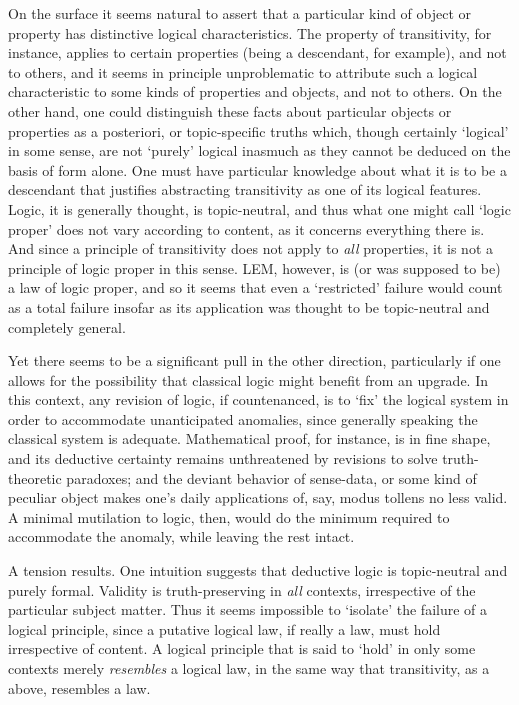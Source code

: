 On the surface it seems natural to assert that a particular kind of object or property has distinctive logical characteristics. The property of transitivity, for instance, applies to certain properties (being a descendant, for example), and not to others, and it seems in principle unproblematic to attribute such a logical characteristic to some kinds of properties and objects, and not to others. On the other hand, one could distinguish these facts about particular objects or properties as a posteriori, or topic-specific truths which, though certainly `logical' in some sense, are not `purely' logical inasmuch as they cannot be deduced on the basis of form alone. One must have particular knowledge about what it is to be a descendant that justifies abstracting transitivity as one of its logical features. Logic, it is generally thought, is topic-neutral, and thus what one might call `logic proper' does not vary according to content, as it concerns everything there is. And since a principle of transitivity does not apply to \emph{all} properties, it is not a principle of logic proper in this sense. LEM, however, is (or was supposed to be) a law of logic proper, and so it seems that even a `restricted' failure would count as a total failure insofar as its application was thought to be topic-neutral and completely general.

Yet there seems to be a significant pull in the other direction, particularly if one allows for the possibility that classical logic might benefit from an upgrade. In this context, any revision of logic, if countenanced, is to `fix' the logical system in order to accommodate unanticipated anomalies, since generally speaking the classical system is adequate. Mathematical proof, for instance, is in fine shape, and its deductive certainty remains unthreatened by revisions to solve truth-theoretic paradoxes; and the deviant behavior of sense-data, or some kind of peculiar object makes one's daily applications of, say, modus tollens no less valid. A minimal mutilation to logic, then, would do the minimum required to accommodate the anomaly, while leaving the rest intact.

A tension results. One intuition suggests that deductive logic is topic-neutral and purely formal. Validity is truth-preserving in \emph{all} contexts, irrespective of the particular subject matter. Thus it seems impossible to `isolate' the failure of a logical principle, since a putative logical law, if really a law, must hold irrespective of content. A logical principle that is said to `hold' in only some contexts merely \emph{resembles} a logical law, in the same way that transitivity, as a above, resembles a law. 

